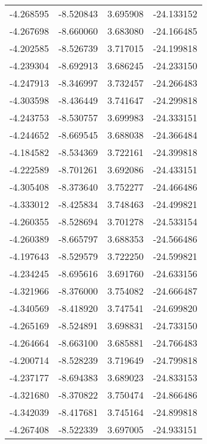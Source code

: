\begin{tabular}{rrrr}
       -4.268595 &        -8.520843 &    3.695908 & -24.133152 \\
       -4.267698 &        -8.660060 &    3.683080 & -24.166485 \\
       -4.202585 &        -8.526739 &    3.717015 & -24.199818 \\
       -4.239304 &        -8.692913 &    3.686245 & -24.233150 \\
       -4.247913 &        -8.346997 &    3.732457 & -24.266483 \\
       -4.303598 &        -8.436449 &    3.741647 & -24.299818 \\
       -4.243753 &        -8.530757 &    3.699983 & -24.333151 \\
       -4.244652 &        -8.669545 &    3.688038 & -24.366484 \\
       -4.184582 &        -8.534369 &    3.722161 & -24.399818 \\
       -4.222589 &        -8.701261 &    3.692086 & -24.433151 \\
       -4.305408 &        -8.373640 &    3.752277 & -24.466486 \\
       -4.333012 &        -8.425834 &    3.748463 & -24.499821 \\
       -4.260355 &        -8.528694 &    3.701278 & -24.533154 \\
       -4.260389 &        -8.665797 &    3.688353 & -24.566486 \\
       -4.197643 &        -8.529579 &    3.722250 & -24.599821 \\
       -4.234245 &        -8.695616 &    3.691760 & -24.633156 \\
       -4.321966 &        -8.376000 &    3.754082 & -24.666487 \\
       -4.340569 &        -8.418920 &    3.747541 & -24.699820 \\
       -4.265169 &        -8.524891 &    3.698831 & -24.733150 \\
       -4.264664 &        -8.663100 &    3.685881 & -24.766483 \\
       -4.200714 &        -8.528239 &    3.719649 & -24.799818 \\
       -4.237177 &        -8.694383 &    3.689023 & -24.833153 \\
       -4.321680 &        -8.370822 &    3.750474 & -24.866486 \\
       -4.342039 &        -8.417681 &    3.745164 & -24.899818 \\
       -4.267408 &        -8.522339 &    3.697005 & -24.933151 \\

\end{tabular}
